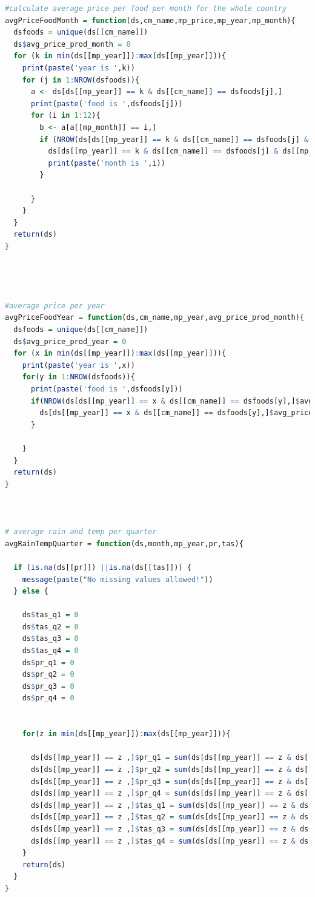 \documentclass[11pt]{article}
\begin{document}
\begin{lstlisting}[language= R]
#calculate average price per food per month for the whole country
avgPriceFoodMonth = function(ds,cm_name,mp_price,mp_year,mp_month){
  dsfoods = unique(ds[[cm_name]])
  ds$avg_price_prod_month = 0
  for (k in min(ds[[mp_year]]):max(ds[[mp_year]])){
    print(paste('year is ',k))
    for (j in 1:NROW(dsfoods)){
      a <- ds[ds[[mp_year]] == k & ds[[cm_name]] == dsfoods[j],]
      print(paste('food is ',dsfoods[j]))
      for (i in 1:12){
        b <- a[a[[mp_month]] == i,]
        if (NROW(ds[ds[[mp_year]] == k & ds[[cm_name]] == dsfoods[j] & ds[[mp_month]] == i,]$avg_price_prod_month) >0) {
          ds[ds[[mp_year]] == k & ds[[cm_name]] == dsfoods[j] & ds[[mp_month]] == i,]$avg_price_prod_month =  sum(b[[mp_price]])/ NROW(b)
          print(paste('month is ',i))  
        }
        
      }
    }
  }
  return(ds)
}




#average price per year
avgPriceFoodYear = function(ds,cm_name,mp_year,avg_price_prod_month){
  dsfoods = unique(ds[[cm_name]]) 
  ds$avg_price_prod_year = 0
  for (x in min(ds[[mp_year]]):max(ds[[mp_year]])){
    print(paste('year is ',x))
    for(y in 1:NROW(dsfoods)){
      print(paste('food is ',dsfoods[y]))
      if(NROW(ds[ds[[mp_year]] == x & ds[[cm_name]] == dsfoods[y],]$avg_price_prod_year) > 0){
        ds[ds[[mp_year]] == x & ds[[cm_name]] == dsfoods[y],]$avg_price_prod_year = sum(ds[ds[[mp_year]] == x & ds[[cm_name]] == dsfoods[y],][[avg_price_prod_month]]) / NROW(ds[ds[[mp_year]] == x & ds[[cm_name]] == dsfoods[y],][[avg_price_prod_month]])
      }
      
    }
  }
  return(ds)
}



# average rain and temp per quarter
avgRainTempQuarter = function(ds,month,mp_year,pr,tas){

  if (is.na(ds[[pr]]) ||is.na(ds[[tas]])) {
    message(paste("No missing values allowed!"))
  } else {

    ds$tas_q1 = 0
    ds$tas_q2 = 0
    ds$tas_q3 = 0
    ds$tas_q4 = 0
    ds$pr_q1 = 0
    ds$pr_q2 = 0
    ds$pr_q3 = 0
    ds$pr_q4 = 0
    
    
    for(z in min(ds[[mp_year]]):max(ds[[mp_year]])){
   
      ds[ds[[mp_year]] == z ,]$pr_q1 = sum(ds[ds[[mp_year]] == z & ds[[month]] %in% c("1","2","3"),][[pr]])/3
      ds[ds[[mp_year]] == z ,]$pr_q2 = sum(ds[ds[[mp_year]] == z & ds[[month]] %in% c("4","5","6"),][[pr]])/3
      ds[ds[[mp_year]] == z ,]$pr_q3 = sum(ds[ds[[mp_year]] == z & ds[[month]] %in% c("7","8","9"),][[pr]])/3
      ds[ds[[mp_year]] == z ,]$pr_q4 = sum(ds[ds[[mp_year]] == z & ds[[month]] %in% c("10","11","12"),][[pr]])/3
      ds[ds[[mp_year]] == z ,]$tas_q1 = sum(ds[ds[[mp_year]] == z & ds[[month]] %in% c("1","2","3"),][[tas]])/3
      ds[ds[[mp_year]] == z ,]$tas_q2 = sum(ds[ds[[mp_year]] == z & ds[[month]] %in% c("4","5","6"),][[tas]])/3
      ds[ds[[mp_year]] == z ,]$tas_q3 = sum(ds[ds[[mp_year]] == z & ds[[month]] %in% c("7","8","9"),][[tas]])/3
      ds[ds[[mp_year]] == z ,]$tas_q4 = sum(ds[ds[[mp_year]] == z & ds[[month]] %in% c("10","11","12"),][[tas]])/3
    }
    return(ds)
  }  
}


\end{lstlisting}
\end{document}
